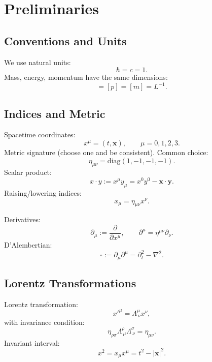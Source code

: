 \section{Preliminaries}

\subsection{Conventions and Units}
We use natural units:
\begin{equation}
\hbar = c = 1.
\end{equation}
Mass, energy, momentum have the same dimensions:
\begin{equation}
[E]=[p]=[m]=L^{-1}.
\end{equation}

\subsection{Indices and Metric}
Spacetime coordinates:
\begin{equation}
x^\mu = (t,\mathbf{x}), \qquad \mu=0,1,2,3.
\end{equation}
Metric signature (choose one and be consistent). Common choice:
\begin{equation}
\eta_{\mu\nu}=\mathrm{diag}(1,-1,-1,-1).
\end{equation}
Scalar product:
\begin{equation}
x\cdot y := x^\mu y_\mu = x^0 y^0 - \mathbf{x}\cdot \mathbf{y}.
\end{equation}
Raising/lowering indices:
\begin{equation}
x_\mu = \eta_{\mu\nu}x^\nu.
\end{equation}

Derivatives:
\begin{equation}
\partial_\mu := \frac{\partial}{\partial x^\mu}, \qquad \partial^\mu = \eta^{\mu\nu}\partial_\nu.
\end{equation}
D'Alembertian:
\begin{equation}
\square := \partial_\mu \partial^\mu = \partial_t^2 - \nabla^2.
\end{equation}

\subsection{Lorentz Transformations}
Lorentz transformation:
\begin{equation}
x'^\mu = \Lambda^\mu_{\ \nu}x^\nu,
\end{equation}
with invariance condition:
\begin{equation}
\eta_{\rho\sigma}\Lambda^\rho_{\ \mu}\Lambda^\sigma_{\ \nu}=\eta_{\mu\nu}.
\end{equation}
Invariant interval:
\begin{equation}
x^2 = x_\mu x^\mu = t^2-|\mathbf{x}|^2.
\end{equation}

